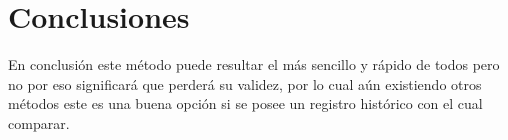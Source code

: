     
    
    
    
    
    \section{Conclusiones}
    
    En conclusión este método puede resultar el más sencillo y rápido de todos pero no por eso significará que perderá su validez, por lo cual aún existiendo otros métodos este es una buena opción si se posee un registro histórico con el cual comparar.
    
